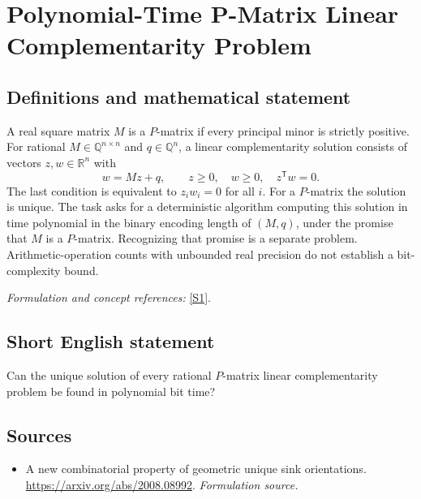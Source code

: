 \documentclass[11pt]{article}
\begin{document}
\section*{\texorpdfstring{Polynomial-Time P-Matrix Linear Complementarity Problem}{Polynomial-Time P-Matrix Linear Complementarity Problem}}\label{424}
\subsection{Definitions and mathematical statement}
A real square matrix $M$ is a $P$-matrix if every principal minor is strictly positive. For rational $M\in{\mathbb{Q}}^{n\times n}$ and $q\in{\mathbb{Q}}^n$, a linear complementarity solution consists of vectors $z,w\in{\mathbb{R}}^n$ with
\[
 w=Mz+q,\qquad z\ge0,\quad w\ge0,\quad z^{\mathsf T}w=0.
\]
The last condition is equivalent to $z_iw_i=0$ for all $i$. For a $P$-matrix the solution is unique. The task asks for a deterministic algorithm computing this solution in time polynomial in the binary encoding length of $(M,q)$, under the promise that $M$ is a $P$-matrix. Recognizing that promise is a separate problem. Arithmetic-operation counts with unbounded real precision do not establish a bit-complexity bound.
\par\smallskip\textit{Formulation and concept references:} \href{https://arxiv.org/abs/2008.08992}{[S1]}.

\subsection{Short English statement}
Can the unique solution of every rational $P$-matrix linear complementarity problem be found in polynomial bit time?
\subsection{Sources}
\begin{itemize}
\item[S1]A new combinatorial property of geometric unique sink orientations.
\url{https://arxiv.org/abs/2008.08992}.
\textit{Formulation source.}
\end{itemize}
\end{document}
